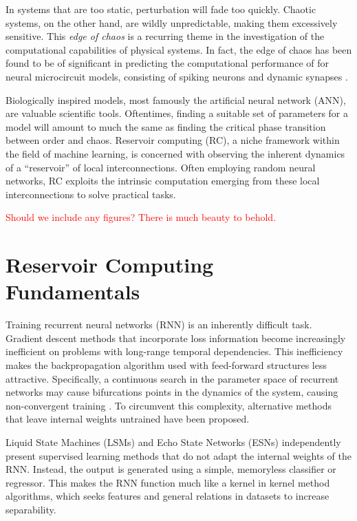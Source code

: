 In systems that are too static, perturbation will fade too quickly. Chaotic
systems, on the other hand, are wildly unpredictable, making them excessively
sensitive. This \textit{edge of chaos} is a recurring theme in the investigation
of the computational capabilities of physical systems. In fact, the edge of
chaos has been found to be of significant in predicting the computational
performance of for neural microcircuit models, consisting of spiking neurons and
dynamic synapses \cite{legenstein_edge_2007}.

Biologically inspired models, most famously the artificial neural network (ANN),
are valuable scientific tools. Oftentimes, finding a suitable set of parameters
for a model will amount to much the same as finding the critical phase
transition between order and chaos. Reservoir computing (RC), a niche framework
within the field of machine learning, is concerned with observing the inherent
dynamics of a ``reservoir'' of local interconnections. Often employing random
neural networks, RC exploits the intrinsic computation emerging from these local
interconnections to solve practical tasks.

\textcolor{red}{
  Should we include any figures? There is much beauty to behold.
}

\section{Reservoir Computing Fundamentals}

Training recurrent neural networks (RNN) is an inherently difficult
task. Gradient descent methods that incorporate loss information become
increasingly inefficient on problems with long-range temporal dependencies. This
inefficiency makes the backpropagation algorithm used with feed-forward
structures less attractive. Specifically, a continuous search in the parameter
space of recurrent networks may cause bifurcations points in the dynamics of the
system, causing non-convergent training \cite{doya_bifurcations_nodate}. To
circumvent this complexity, alternative methods that leave internal weights
untrained have been proposed.

Liquid State Machines (LSMs) \cite{maass_real-time_2002} and Echo State Networks
(ESNs) \cite{jaeger_echo_2001} independently present supervised learning methods
that do not adapt the internal weights of the RNN. Instead, the output is
generated using a simple, memoryless classifier or regressor. This makes the RNN
function much like a kernel in kernel method algorithms, which seeks features
and general relations in datasets to increase separability.

